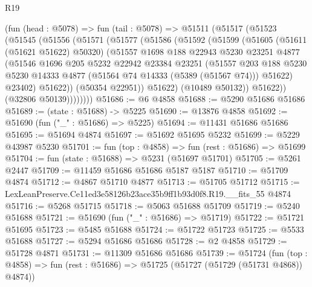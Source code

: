 \begin{lexlean}{R19}
\begin{coremodule}
        (fun (head : @5078) =>
        fun (tail : @5078) =>
        @51511
          (@51517
            (@51523
              (@51545
                (@51556
                  (@51571
                    (@51577
                      (@51586
                        (@51592
                          (@51599
                            (@51605
                              (@51611 (@51621 @51622) @50320)
                              (@51557
                                @1698
                                @188
                                @22943
                                @5230
                                @23251
                                @4877
                                (@51546
                                  @1696
                                  @205
                                  @5232
                                  @22942
                                  @23384
                                  @23251
                                  (@51557
                                    @203
                                    @188
                                    @5230
                                    @5230
                                    @14333
                                    @4877
                                    (@51564 @74 @14333 (@5389 (@51567 @74)))
                                    @51622)
                                  @23402)
                                @51622))
                            (@50354 @22951))
                          @51622)
                        (@10489 @50132))
                      @51622))
                  (@32806 @50139))))))))
@51686 := @6 @4858
@51688 := @5290 @51686 @51686
@51689 := (state : @51688) -> @5225
@51690 := @13876 @4858
@51692 := @51690 (fun ("_" : @51686) => @5225)
@51694 := @11431 @51686 @51686
@51695 := @51694 @4874
@51697 := @51692 @51695 @5232
@51699 := @5229 @43987 @5230
@51701 := fun (top : @4858) => fun (rest : @51686) => @51699
@51704 := fun (state : @51688) => @5231 (@51697 @51701)
@51705 := @5261 @2447
@51709 := @11459 @51686 @51686 @5187 @5187
@51710 := @51709 @4874
@51712 := @4867 @51710 @4877
@51713 := @51705 @51712
@51715 := LexLeanPreserve.Ce11ed3e58126b23ace35b9ff1b93d0f8.R19.__fits_55 @4874
@51716 := @5268 @51715
@51718 := @5063 @51688 @51709
@51719 := @5240 @51688
@51721 := @51690 (fun ("_" : @51686) => @51719)
@51722 := @51721 @51695
@51723 := @5485 @51688
@51724 := @51722 @51723
@51725 := @5533 @51688
@51727 := @5294 @51686 @51686
@51728 := @2 @4858
@51729 := @51728 @4871
@51731 := @11309 @51686 @51686
@51739 := @51724
    (fun (top : @4858) => fun (rest : @51686) => @51725 (@51727 (@51729 (@51731 @4868)) @4874))

\end{coremodule}
\end{lexlean}
